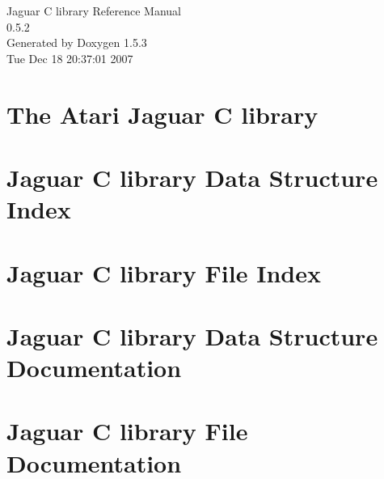 \documentclass[a4paper]{book}
\begin{document}
\begin{titlepage}
\vspace*{7cm}
\begin{center}
{\Large Jaguar C library Reference Manual\\[1ex]\large 0.5.2 }\\
\vspace*{1cm}
{\large Generated by Doxygen 1.5.3}\\
\vspace*{0.5cm}
{\small Tue Dec 18 20:37:01 2007}\\
\end{center}
\end{titlepage}
\clearemptydoublepage
{}
\tableofcontents
\clearemptydoublepage
{}
\chapter{The Atari Jaguar C library }
\label{index}\hypertarget{index}{}
\chapter{Jaguar C library Data Structure Index}

\chapter{Jaguar C library File Index}

\chapter{Jaguar C library Data Structure Documentation}


\chapter{Jaguar C library File Documentation}






\printindex
\end{document}
